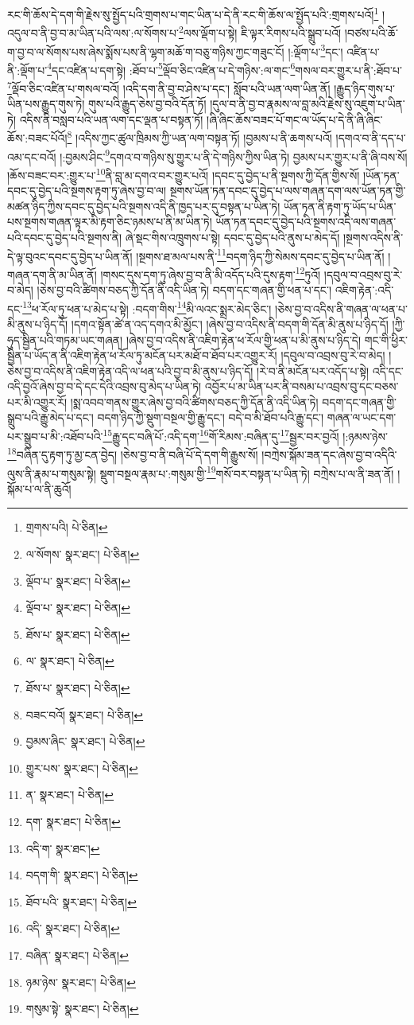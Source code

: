 རང་གི་ཆོས་དེ་དག་གི་རྗེས་སུ་སྤྱོད་པའི་གྲགས་པ་གང་ཡིན་པ་དེ་ནི་རང་གི་ཆོས་ལ་སྤྱོད་པའི་:གྲགས་པའོ།\footnote{གྲགས་པའི།  པེ་ཅིན། } །འདུལ་བ་ནི་བྱ་བ་མ་ཡིན་པའི་ལས་:ལ་སོགས་པ་\footnote{ལ་སོགས་  སྣར་ཐང་།  པེ་ཅིན། }ལས་ལྡོག་པ་སྟེ། ཇི་ལྟར་རིགས་པའི་སྒྲུབ་པའོ། །བཙས་པའི་ཆོ་ག་བྱ་བ་ལ་སོགས་པས་ཞེས་སྨོས་པས་ནི་ལྷག་མཆོ་ག་བཅུ་གཉིས་ཀྱང་གཟུང་ངོ། །:ལྡོག་པ་\footnote{ལྡོབ་པ་  སྣར་ཐང་།  པེ་ཅིན། }དང་། འཛིན་པ་ནི་:ལྡོག་པ་\footnote{ལྡོབ་པ་  སྣར་ཐང་།  པེ་ཅིན། }དང་འཛིན་པ་དག་སྟེ། :ཐོབ་པ་\footnote{ཐོས་པ་  སྣར་ཐང་།  པེ་ཅིན། }ལྡོབ་ཅིང་འཛིན་པ་དེ་གཉིས་:ལ་གང་\footnote{ལ་  སྣར་ཐང་།  པེ་ཅིན། }གསལ་བར་གྱུར་པ་ནི་:ཐོབ་པ་\footnote{ཐོས་པ་  སྣར་ཐང་།  པེ་ཅིན། }ལྡོབ་ཅིང་འཛིན་པ་གསལ་བའོ། །འདི་དག་ནི་བྱ་བ་ཤེས་པ་དང་། སློབ་པའི་ཡན་ལག་ཡིན་ནོ། །རྒྱུད་ཉིད་གུས་པ་ཡིན་པས་རྒྱུད་གུས་ཏེ། གུས་པའི་རྒྱུད་ཅེས་བྱ་བའི་དོན་ཏོ། །དུལ་བ་ནི་བྱ་བ་རྣམས་ལ་བླ་མའི་རྗེས་སུ་འཇུག་པ་ཡིན་ཏེ། འདིས་ནི་བསླབ་པའི་ཡན་ལག་དང་ལྡན་པ་བསྟན་ཏོ། །ཞི་ཞིང་ཆོས་བཟང་པོ་གང་ལ་ཡོད་པ་དེ་ནི་ཞི་ཞིང་ཆོས་:བཟང་པོའོ།\footnote{བཟང་བའོ།  སྣར་ཐང་།  པེ་ཅིན། } །འདིས་ཀྱང་ཚུལ་ཁྲིམས་ཀྱི་ཡན་ལག་བསྟན་ཏོ། །བྱམས་པ་ནི་ཆགས་པའོ། །དགའ་བ་ནི་དད་པ་འམ་དང་བའོ། །:བྱམས་ཤིང་\footnote{བྱམས་ཞིང་  སྣར་ཐང་།  པེ་ཅིན། }དགའ་བ་གཉིས་སུ་གྱུར་པ་ནི་དེ་གཉིས་ཀྱིས་ཡིན་ཏེ། བྱམས་པར་གྱུར་པ་ནི་ཞི་བས་སོ། །ཆོས་བཟང་བར་:གྱུར་པ་\footnote{གྱུར་པས་  སྣར་ཐང་།  པེ་ཅིན། }ནི་བླ་མ་དགའ་བར་གྱུར་པའོ། །དབང་དུ་བྱེད་པ་ནི་སྔགས་ཀྱི་དོན་གྱིས་སོ། །ཡོན་ཏན་དབང་དུ་བྱེད་པའི་སྔགས་རྟག་ཏུ་ཞེས་བྱ་བ་ལ། སྔགས་ཡོན་ཏན་དབང་དུ་བྱེད་པ་ལས་གཞན་དག་ལས་ཡོན་ཏན་གྱི་མཚན་ཉིད་ཀྱིས་དབང་དུ་བྱེད་པའི་སྔགས་འདི་ནི་ཁྱད་པར་དུ་བསྟན་པ་ཡིན་ཏེ། ཡོན་ཏན་ནི་རྟག་ཏུ་ཡོད་པ་ཡིན་པས་སྔགས་གཞན་ལྟར་མི་རྟག་ཅིང་ཉམས་པ་ནི་མ་ཡིན་ཏེ། ཡོན་ཏན་དབང་དུ་བྱེད་པའི་སྔགས་འདི་ལས་གཞན་པའི་དབང་དུ་བྱེད་པའི་སྔགས་ནི། ཞེ་སྡང་གིས་འཁྲུགས་པ་སྟེ། དབང་དུ་བྱེད་པའི་ནུས་པ་མེད་དོ། །སྔགས་འདིས་ནི་དེ་ལྟ་བུའང་དབང་དུ་བྱེད་པ་ཡིན་ནོ། །སྔགས་ཐ་མལ་པས་ནི་\footnote{ན་  སྣར་ཐང་།  པེ་ཅིན། }བདག་ཉིད་ཀྱི་སེམས་དབང་དུ་བྱེད་པ་ཡིན་ནོ། །གཞན་དག་ནི་མ་ཡིན་ནོ། །གསང་དུས་དག་ཏུ་ཞེས་བྱ་བ་ནི་མི་འདོད་པའི་དུས་རྟག་\footnote{དག་  སྣར་ཐང་།  པེ་ཅིན། }ཏུའོ། །དབུལ་བ་འབྲས་བུ་རེ་བ་མེད། །ཅེས་བྱ་བའི་ཚིགས་བཅད་ཀྱི་དོན་ནི་འདི་ཡིན་ཏེ། བདག་དང་གཞན་གྱི་ཕན་པ་དང་། འཇིག་རྟེན་:འདི་དང་\footnote{འདི་ག་  སྣར་ཐང་། }ཕ་རོལ་ཏུ་ཕན་པ་མེད་པ་སྟེ། :བདག་གིས་\footnote{བདག་གི་  སྣར་ཐང་།  པེ་ཅིན། }མི་ལའང་སྨྲར་མེད་ཅིང་། །ཅེས་བྱ་བ་འདིས་ནི་གཞན་ལ་ཕན་པ་མི་ནུས་པ་ཉིད་དོ། །དགའ་སྟོན་ཚེ་ན་འད་དགའ་མི་མྱོང་། །ཞེས་བྱ་བ་འདིས་ནི་བདག་གི་དོན་མི་ནུས་པ་ཉིད་དོ། །ཀྱི་ཧུད་སྦྱིན་པའི་གཏམ་ཡང་གཞན། །ཞེས་བྱ་བ་འདིས་ནི་འཇིག་རྟེན་ཕ་རོལ་གྱི་ཕན་པ་མི་ནུས་པ་ཉིད་དེ། གང་གི་ཕྱིར་སྦྱིན་པ་ཡོད་ན་ནི་འཇིག་རྟེན་ཕ་རོལ་ཏུ་མངོན་པར་མཐོ་བ་ཐོབ་པར་འགྱུར་རོ། །དབུལ་བ་འབྲས་བུ་རེ་བ་མེད། །ཅེས་བྱ་བ་འདིས་ནི་འཇིག་རྟེན་འདི་ལ་ཕན་པའི་བྱ་བ་མི་ནུས་པ་ཉིད་དོ། །རེ་བ་ནི་མངོན་པར་འདོད་པ་སྟེ། འདི་དང་འདི་བྱའོ་ཞེས་བྱ་བ་དེ་དང་དེའི་འབྲས་བུ་མེད་པ་ཡིན་ཏེ། འབྱོར་པ་མ་ཡིན་པར་ནི་བསམ་པ་འབྲས་བུ་དང་བཅས་པར་མི་འགྱུར་རོ། །སྨ་འབབ་གནས་གྱུར་ཞེས་བྱ་བའི་ཚིགས་བཅད་ཀྱི་དོན་ནི་འདི་ཡིན་ཏེ། བདག་དང་གཞན་གྱི་སྒྲུབ་པའི་རྒྱུ་མེད་པ་དང་། བདག་ཉིད་ཀྱི་སྡུག་བསྔལ་གྱི་རྒྱུ་དང་། བདེ་བ་མི་ཐོབ་པའི་རྒྱུ་དང་། གཞན་ལ་ཡང་དག་པར་སྒྲུབ་པ་མི་:འཐོབ་པའི་\footnote{ཐོབ་པའི་  སྣར་ཐང་།  པེ་ཅིན། }རྒྱུ་དང་བཞི་པོ་:འདི་དག་\footnote{འདི་  སྣར་ཐང་།  པེ་ཅིན། }གོ་རིམས་:བཞིན་དུ་\footnote{བཞིན་  སྣར་ཐང་།  པེ་ཅིན། }སྦྱར་བར་བྱའོ། །:ཉམས་ཉེས་\footnote{ཉམ་ཉེས་  སྣར་ཐང་།  པེ་ཅིན། }བཞིན་དུ་རྟག་ཏུ་མྱ་ངན་བྱེད། །ཅེས་བྱ་བ་ནི་བཞི་པོ་དེ་དག་གི་རྒྱུས་སོ། །བཀྲེས་སྐོམ་ཟན་དང་ཞེས་བྱ་བ་འདིའི་ལུས་ནི་རྣམ་པ་གསུམ་སྟེ། སྡུག་བསྔལ་རྣམ་པ་:གསུམ་གྱི་\footnote{གསུམ་སྟེ་  སྣར་ཐང་།  པེ་ཅིན། }གསོ་བར་བསྟན་པ་ཡིན་ཏེ། བཀྲེས་པ་ལ་ནི་ཟན་ནོ། །སྐོམ་པ་ལ་ནི་ཆུའོ། 